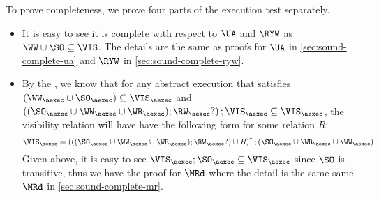 To prove completeness, we prove four parts of the execution test separately.
\begin{itemize}
\item It is easy to see it is complete with respect to \( \UA \) and \( \RYW \) as \( \WW \cup \SO \subseteq \VIS \).
    The details are the same as proofs for \( \UA \) in \cref{sec:sound-complete-ua} and \( \RYW \) in \cref{sec:sound-complete-ryw}.

\item By the \cite{SIanalysis}, we know that for any abstract execution that satisfies \( (\WW_\aexec \cup \SO_\aexec) \subseteq \VIS_\aexec \)
and \( \left( (\SO_\aexec \cup \WW_\aexec \cup \WR_\aexec ) ; \RW_{\aexec}? \right) ; \VIS_\aexec \subseteq \VIS_\aexec \),
the visibility relation will have have the following form for some relation \( R \):
\[
    \VIS_\aexec = \left( \left( (\SO_\aexec \cup \WW_\aexec \cup \WR_\aexec ) ; \RW_{\aexec}? \right)  \cup R \right)^* ; (\SO_\aexec \cup \WR_\aexec \cup \WW_\aexec) 
\]
Given above, it is easy to see \( \VIS_\aexec ; \SO_\aexec \subseteq \VIS_\aexec \) since \( \SO \) is transitive, 
thus we have the proof for \( \MRd \) where the detail is the same same \( \MRd \) in \cref{sec:sound-complete-mr}.


\end{itemize}
